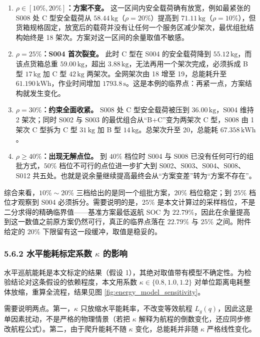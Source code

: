 \documentclass[withoutpreface,bwprint]{format}
\begin{document}
\begin{enumerate}[leftmargin=*]
    \item \textbf{$\rho \in [10\%,20\%]$：方案不变。} 这一区间内安全载荷确有放宽，例如最紧张的 S008 处 C 型安全载荷从 $58.44\,\text{kg}$（$\rho=20\%$）提高到 $71.11\,\text{kg}$（$\rho=10\%$），但货箱规格固定，放宽后的载荷并没有让任何一个服务区减少架次，最优组批结构始终是 18 架次。方案对这一区间的余量取值不敏感。

    \item \textbf{$\rho=25\%$：S004 首次裂变。} 此时 C 型在 S004 的安全载荷降到 $55.12\,\text{kg}$，而该点货箱总重 $59.00\,\text{kg}$，超出 $3.88\,\text{kg}$，无法再用一个架次完成，必须拆成 B 型 $17\,\text{kg}$ 加 C 型 $42\,\text{kg}$ 两架次。全网架次由 18 增至 19，总能耗升至 $61.190\,\text{kWh}$，作业时间增加 $1793.8\,\text{s}$。这是本例的临界点：再紧一点，方案结构就发生变化。

    \item \textbf{$\rho=30\%$：约束全面收紧。} S008 处 C 型安全载荷被压到 $36.00\,\text{kg}$，S004 维持 2 架次；同时 S002 与 S003 的最优组合从“B$+$C”变为两架次 C 型，S008 由 1 架次 C 型拆为 C 型 $31\,\text{kg}$ 加 B 型 $14\,\text{kg}$。总架次升至 20，总能耗 $67.358\,\text{kWh}$。

    \item \textbf{$\rho \ge 40\%$：出现无解点位。} 到 $40\%$ 档位时 S004 与 S008 已没有任何可行的组批方式，$50\%$ 档位不可行的点位进一步扩大到 S002、S003、S004、S008、S012 共五处。也就是说余量继续提高最终会从“方案变差”转为“方案不存在”。
\end{enumerate}

综合来看，$10\%\sim20\%$ 三档给出的是同一个组批方案，$20\%$ 档位稳定；到 $25\%$ 档位才观察到 S004 必须拆分。需要说明的是，$25\%$ 是本文计算过的采样档位，不是二分求得的精确临界值——基准方案最低返航 SOC 为 $22.79\%$，因此在余量提高到这一数值之前原方案仍然可行，真正的临界点落在 $22.79\%$ 与 $25\%$ 之间。附件给定的 $20\%$ 下限留有这一段缓冲，取值是稳妥的。

\subsubsection{\texorpdfstring{5.6.2 水平能耗标定系数 $\kappa$ 的影响}{5.6.2 水平能耗标定系数 kappa 的影响}}
水平巡航能耗是本文标定的结果（假设 1），其绝对取值带有模型不确定性。为检验结论对这条假设的依赖程度，本文用系数 $\kappa \in \{0.8,1.0,1.2\}$ 对单位距离电耗整体放缩，重算全流程，结果见图 \ref{fig:energy_model_sensitivity}。

需要说明两点。第一，$\kappa$ 只放缩水平能耗率，不改变等效航程 $L_g(q)$，因此这是单因素扰动，不是严格的物理情景（若把 $\kappa$ 解释为航程的倒数变化，还应同步修改航程公式）。第二，由于爬升能耗不随 $\kappa$ 变化，总能耗并非随 $\kappa$ 严格线性变化。
\end{document}
